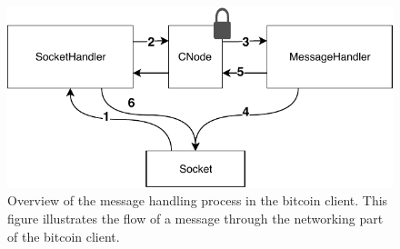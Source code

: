 \begin{figure}[!htb]
	\begin{center}
		\includegraphics{Figures/dataflow}
		\caption[Overview of the message handling process in the bitcoin client.]{\label{fig:dataflow} Overview of the message handling process in the bitcoin client. This figure illustrates the flow of a message through the networking part of the bitcoin client.}
	\end{center}
\end{figure}







